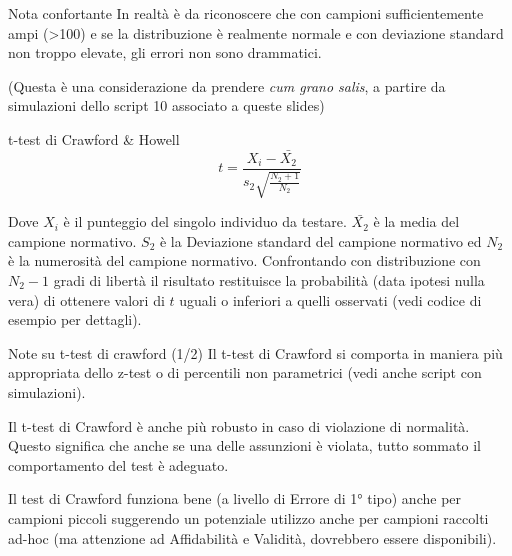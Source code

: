 \documentclass[
  ignorenonframetext,
]{beamer}
\begin{document}
\begin{frame}{Nota confortante}
\label{nota-confortante}
In realtà è da riconoscere che con campioni sufficientemente ampi
(\textgreater100) e se la distribuzione è realmente normale e con
deviazione standard non troppo elevate, gli errori non sono drammatici.

(Questa è una considerazione da prendere \emph{cum grano salis}, a
partire da simulazioni dello script 10 associato a queste slides)
\end{frame}


\begin{frame}{t-test di Crawford \& Howell}
\label{t-test-di-crawford-howell}
\[
t = \frac{X_i - \bar{X_2}}{s_2\sqrt{\frac{N_2+1}{N_2}}}
\]

\vspace{1em}

Dove \(X_i\) è il punteggio del singolo individuo da testare.
\(\bar{X_2}\) è la media del campione normativo. \(S_2\) è la Deviazione
standard del campione normativo ed \(N_2\) è la numerosità del campione
normativo. Confrontando con distribuzione con \(N_2-1\) gradi di libertà
il risultato restituisce la probabilità (data ipotesi nulla vera) di
ottenere valori di \(t\) uguali o inferiori a quelli osservati (vedi
codice di esempio per dettagli).
\end{frame}

\begin{frame}{Note su t-test di crawford (1/2)}
\label{note-su-t-test-di-crawford-12}
Il t-test di Crawford si comporta in maniera più appropriata dello
z-test o di percentili non parametrici (vedi anche script con
simulazioni).

Il t-test di Crawford è anche più robusto in caso di violazione di
normalità. Questo significa che anche se una delle assunzioni è violata,
tutto sommato il comportamento del test è adeguato.

Il test di Crawford funziona bene (a livello di Errore di 1° tipo) anche
per campioni piccoli suggerendo un potenziale utilizzo anche per
campioni raccolti ad-hoc (ma attenzione ad Affidabilità e Validità,
dovrebbero essere disponibili).
\end{frame}
\end{document}
